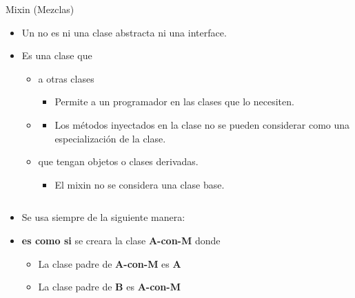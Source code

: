 \documentclass[10pt, envcountsect , spanish]{beamer}
\begin{document}
\begin{frame}{Mixin (Mezclas)} 

\begin{itemize}
\item  Un  no es ni una clase abstracta ni una interface.

\item  Es una clase que 
	\begin{itemize}
	\item {} a otras clases
	\begin{itemize}
	\item Permite a un programador  en las clases que lo necesiten.
	\end{itemize}
	
	
	\item {}

	\begin{itemize}
	\item Los métodos inyectados en la clase no se pueden considerar como una especialización  de la clase.
	\end{itemize}
	
	\item {} que tengan  objetos o  clases derivadas.
	
	\begin{itemize}
	\item El mixin no se considera una clase base.
	\end{itemize}
	
	\end{itemize}

{\footnotesize

}

\end{itemize}

\begin{columns}

\begin{column}{.78\textwidth}

\begin{itemize}

\item Se usa siempre de la siguiente manera: \\
\hfil {}

\item {} \textbf{es como si} se creara la clase  \textbf{A-con-M} donde
\begin{itemize}
\item La clase padre de \textbf{A-con-M} es \textbf{A}
\item La clase padre de \textbf{B} es \textbf{A-con-M}
\end{itemize}


\end{itemize}
\end{column}
\end{columns}
\end{frame}
\end{document}
